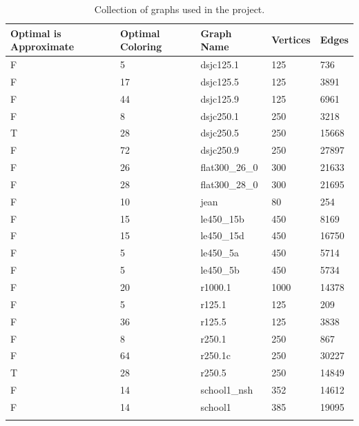 \documentclass[runningheads]{llncs}
\begin{document}
\begin{longtable}{|l|l|l|l|l|}
  \hline
  \rowcolor[HTML]{F56B00}
  Optimal is Approximate & Optimal Coloring & Graph Name     & Vertices & Edges \\ \hline
  \endhead
%
  F          & 5                & dsjc125.1      & 125      & 736   \\ \hline
  F          & 17               & dsjc125.5      & 125      & 3891  \\ \hline
  F          & 44               & dsjc125.9      & 125      & 6961  \\ \hline
  F          & 8                & dsjc250.1      & 250      & 3218  \\ \hline
  T          & 28               & dsjc250.5      & 250      & 15668 \\ \hline
  F          & 72               & dsjc250.9      & 250      & 27897 \\ \hline
  F          & 26               & flat300\_26\_0 & 300      & 21633 \\ \hline
  F          & 28               & flat300\_28\_0 & 300      & 21695 \\ \hline
  F          & 10               & jean           & 80       & 254   \\ \hline
  F          & 15               & le450\_15b     & 450      & 8169  \\ \hline
  F          & 15               & le450\_15d     & 450      & 16750 \\ \hline
  F          & 5                & le450\_5a      & 450      & 5714  \\ \hline
  F          & 5                & le450\_5b      & 450      & 5734  \\ \hline
  F          & 20               & r1000.1        & 1000     & 14378 \\ \hline
  F          & 5                & r125.1         & 125      & 209   \\ \hline
  F          & 36               & r125.5         & 125      & 3838  \\ \hline
  F          & 8                & r250.1         & 250      & 867   \\ \hline
  F          & 64               & r250.1c        & 250      & 30227 \\ \hline
  T          & 28               & r250.5         & 250      & 14849 \\ \hline
  F          & 14               & school1\_nsh   & 352      & 14612 \\ \hline
  F          & 14               & school1        & 385      & 19095 \\ \hline
\caption{\label{tab:graphs}Collection of graphs used in the project.}
\end{longtable}
\end{document}
